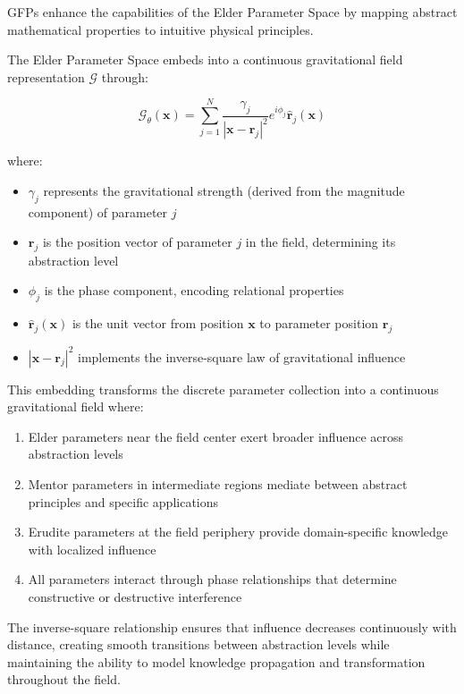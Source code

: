 GFPs enhance the capabilities of the Elder Parameter Space by mapping abstract mathematical properties to intuitive physical principles.

\begin{theorem}
The Elder Parameter Space embeds into a continuous gravitational field representation $\mathcal{G}$ through:

\begin{equation}
\mathcal{G}_{\theta}(\mathbf{x}) = \sum_{j=1}^N \frac{\gamma_j}{|\mathbf{x} - \mathbf{r}_j|^2} e^{i\phi_j} \hat{\mathbf{r}}_j(\mathbf{x})
\end{equation}

where:
\begin{itemize}
    \item $\gamma_j$ represents the gravitational strength (derived from the magnitude component) of parameter $j$
    \item $\mathbf{r}_j$ is the position vector of parameter $j$ in the field, determining its abstraction level
    \item $\phi_j$ is the phase component, encoding relational properties
    \item $\hat{\mathbf{r}}_j(\mathbf{x})$ is the unit vector from position $\mathbf{x}$ to parameter position $\mathbf{r}_j$
    \item $|\mathbf{x} - \mathbf{r}_j|^2$ implements the inverse-square law of gravitational influence
\end{itemize}

This embedding transforms the discrete parameter collection into a continuous gravitational field where:
\begin{enumerate}
    \item Elder parameters near the field center exert broader influence across abstraction levels
    \item Mentor parameters in intermediate regions mediate between abstract principles and specific applications
    \item Erudite parameters at the field periphery provide domain-specific knowledge with localized influence
    \item All parameters interact through phase relationships that determine constructive or destructive interference
\end{enumerate}

The inverse-square relationship ensures that influence decreases continuously with distance, creating smooth transitions between abstraction levels while maintaining the ability to model knowledge propagation and transformation throughout the field.
\end{theorem}

